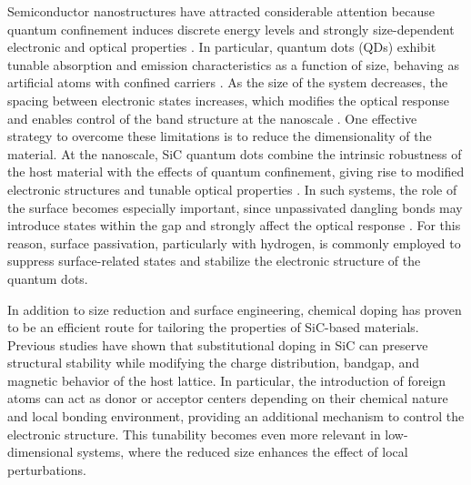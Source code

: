 \documentclass[11pt]{article} %
\begin{document}
Semiconductor nanostructures have attracted considerable attention because quantum confinement induces discrete energy levels and strongly size-dependent electronic and optical properties \cite{Zhang_Zhenkui_2021,de_Vries,Beke2012, Azar2025}. In particular, quantum dots (QDs) exhibit tunable absorption and emission characteristics as a function of size, behaving as artificial atoms with confined carriers \cite{Zhang_Zhenkui_2021,Yuanyuan_Li_2021}. As the size of the system decreases, the spacing between electronic states increases, which modifies the optical response and enables control of the band structure at the nanoscale \cite{de_Vries,Beke2012}.
One effective strategy to overcome these limitations is to reduce the dimensionality of the material. At the nanoscale, SiC quantum dots combine the intrinsic robustness of the host material with the effects of quantum confinement, giving rise to modified electronic structures and tunable optical properties \cite{Zhang_Zhenkui_2021}. In such systems, the role of the surface becomes especially important, since unpassivated dangling bonds may introduce states within the gap and strongly affect the optical response \cite{Beke2012,Ivanov1992}. For this reason, surface passivation, particularly with hydrogen, is commonly employed to suppress surface-related states and stabilize the electronic structure of the quantum dots.

In addition to size reduction and surface engineering, chemical doping has proven to be an efficient route for tailoring the properties of SiC-based materials. Previous studies have shown that substitutional doping in SiC can preserve structural stability while modifying the charge distribution, bandgap, and magnetic behavior of the host lattice. In particular, the introduction of foreign atoms can act as donor or acceptor centers depending on their chemical nature and local bonding environment, providing an additional mechanism to control the electronic structure. This tunability becomes even more relevant in low-dimensional systems, where the reduced size enhances the effect of local perturbations\cite{CUEVAS2026114706,CUEVAS2026114484}.
\end{document}

